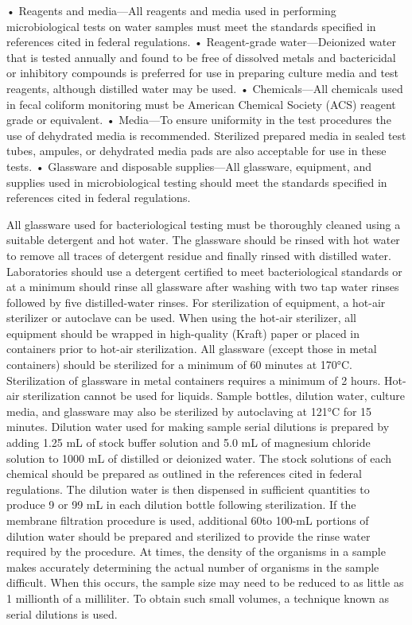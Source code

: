 \documentclass{article}
\begin{document}
• Reagents and media---All reagents and media used in performing
microbiological tests on water samples must meet the standards specified
in references cited in federal regulations. • Reagent-grade
water---Deionized water that is tested annually and found to be free of
dissolved metals and bactericidal or inhibitory compounds is preferred
for use in preparing culture media and test reagents, although distilled
water may be used. • Chemicals---All chemicals used in fecal coliform
monitoring must be American Chemical Society (ACS) reagent grade or
equivalent. • Media---To ensure uniformity in the test procedures the
use of dehydrated media is recommended. Sterilized prepared media in
sealed test tubes, ampules, or dehydrated media pads are also acceptable
for use in these tests. • Glassware and disposable supplies---All
glassware, equipment, and supplies used in microbiological testing
should meet the standards specified in references cited in federal
regulations.

All glassware used for bacteriological testing must be thoroughly
cleaned using a suitable detergent and hot water. The glassware should
be rinsed with hot water to remove all traces of detergent residue and
finally rinsed with distilled water. Laboratories should use a detergent
certified to meet bacteriological standards or at a minimum should rinse
all glassware after washing with two tap water rinses followed by five
distilled-water rinses. For sterilization of equipment, a hot-air
sterilizer or autoclave can be used. When using the hot-air sterilizer,
all equipment should be wrapped in high-quality (Kraft) paper or placed
in containers prior to hot-air sterilization. All glassware (except
those in metal containers) should be sterilized for a minimum of 60
minutes at 170°C. Sterilization of glassware in metal containers
requires a minimum of 2 hours. Hot-air sterilization cannot be used for
liquids. Sample bottles, dilution water, culture media, and glassware
may also be sterilized by autoclaving at 121°C for 15 minutes. Dilution
water used for making sample serial dilutions is prepared by adding 1.25
mL of stock buffer solution and 5.0 mL of magnesium chloride solution to
1000 mL of distilled or deionized water. The stock solutions of each
chemical should be prepared as outlined in the references cited in
federal regulations. The dilution water is then dispensed in sufficient
quantities to produce 9 or 99 mL in each dilution bottle following
sterilization. If the membrane filtration procedure is used, additional
60to 100-mL portions of dilution water should be prepared and sterilized
to provide the rinse water required by the procedure. At times, the
density of the organisms in a sample makes accurately determining the
actual number of organisms in the sample difficult. When this occurs,
the sample size may need to be reduced to as little as 1 millionth of a
milliliter. To obtain such small volumes, a technique known as serial
dilutions is used.
\end{document}
